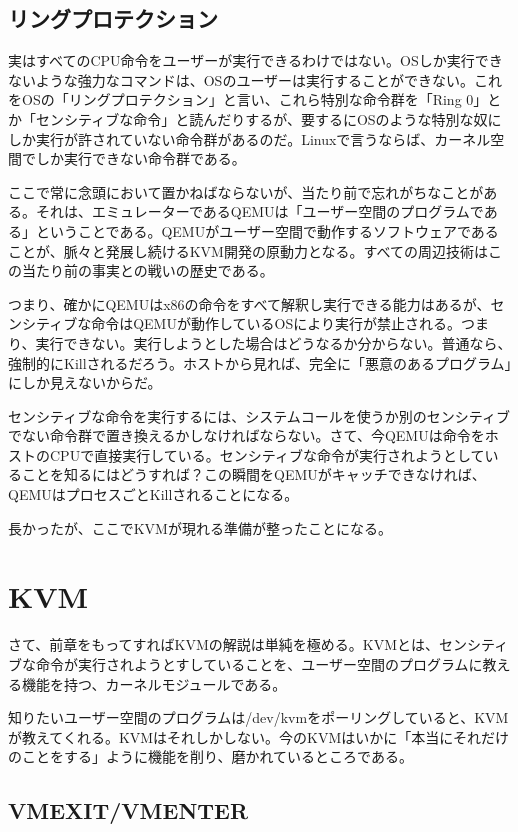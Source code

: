 ﻿\documentclass[9pt,b5paper,tombo,openany]{jsbook}
\begin{document}
\subsection{リングプロテクション}

実はすべてのCPU命令をユーザーが実行できるわけではない。OSしか実行できないような強力なコマンドは、OSのユーザーは実行することができない。これをOSの「リングプロテクション」と言い、これら特別な命令群を「Ring 0」とか「センシティブな命令」と読んだりするが、要するにOSのような特別な奴にしか実行が許されていない命令群があるのだ。Linuxで言うならば、カーネル空間でしか実行できない命令群である。

ここで常に念頭において置かねばならないが、当たり前で忘れがちなことがある。それは、エミュレーターであるQEMUは「ユーザー空間のプログラムである」ということである。QEMUがユーザー空間で動作するソフトウェアであることが、脈々と発展し続けるKVM開発の原動力となる。すべての周辺技術はこの当たり前の事実との戦いの歴史である。

つまり、確かにQEMUはx86の命令をすべて解釈し実行できる能力はあるが、センシティブな命令はQEMUが動作しているOSにより実行が禁止される。つまり、実行できない。実行しようとした場合はどうなるか分からない。普通なら、強制的にKillされるだろう。ホストから見れば、完全に「悪意のあるプログラム」にしか見えないからだ。

センシティブな命令を実行するには、システムコールを使うか別のセンシティブでない命令群で置き換えるかしなければならない。さて、今QEMUは命令をホストのCPUで直接実行している。センシティブな命令が実行されようとしていることを知るにはどうすれば？この瞬間をQEMUがキャッチできなければ、QEMUはプロセスごとKillされることになる。

長かったが、ここでKVMが現れる準備が整ったことになる。

\section{KVM}

さて、前章をもってすればKVMの解説は単純を極める。KVMとは、センシティブな命令が実行されようとすしていることを、ユーザー空間のプログラムに教える機能を持つ、カーネルモジュールである。

知りたいユーザー空間のプログラムは/dev/kvmをポーリングしていると、KVMが教えてくれる。KVMはそれしかしない。今のKVMはいかに「本当にそれだけのことをする」ように機能を削り、磨かれているところである。

\subsection{VMEXIT/VMENTER}
\end{document}

